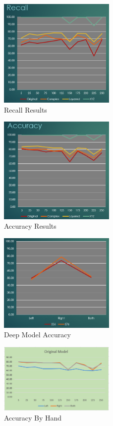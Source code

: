 \documentclass[]{report}
\begin{document}
\begin{figure}
	\centering
	\includegraphics[width=0.5\textwidth]{../images/recall}
	\caption{Recall Results}
	\label{recall}
\end{figure}
\begin{figure}
	\centering
	\includegraphics[width=0.5\textwidth]{../images/accuracy}
	\caption{Accuracy Results}
	\label{accuracy}
\end{figure}
\begin{figure}
	\centering
	\includegraphics[width=0.5\textwidth]{../images/accuracy-deep}
	\caption{Deep Model Accuracy}
	\label{acuracy-deep}
\end{figure}
\begin{figure}
	\centering
	\includegraphics[width=0.5\textwidth]{../images/handed-original}
	\caption{Accuracy By Hand}
	\label{handedness-original}
\end{figure}
\end{document}
